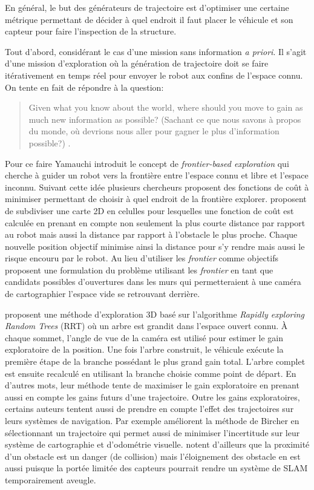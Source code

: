 En général, le but des générateurs de trajectoire est d'optimiser une certaine métrique permettant de décider à quel endroit il faut placer le véhicule et son capteur pour faire l'inspection de la structure.

Tout d'abord, considérant le cas d'une mission sans information \textit{a priori}. Il s'agit d'une mission d'exploration où la génération de trajectoire doit se faire itérativement en temps réel pour envoyer le robot aux confins de l'espace connu. On tente en fait de répondre à la question:

\begin{quote}
  Given what you know about the world, where should you move to gain as much new information as possible? (Sachant ce que nous savons à propos du monde, où devrions nous aller pour gagner le plus d'information possible?) \citep{Yamauchi1997}.
\end{quote}

Pour ce faire Yamauchi introduit le concept de \textit{frontier-based exploration} qui cherche à guider un robot vers la frontière entre l'espace connu et libre et l'espace inconnu. Suivant cette idée plusieurs chercheurs proposent des fonctions de coût à minimiser permettant de choisir à quel endroit de la frontière explorer. \citep{Wirth2007} proposent de subdiviser une carte 2D en celulles pour lesquelles une fonction de coût est calculée en prenant en compte non seulement la plus courte distance par rapport au robot mais aussi la distance par rapport à l'obstacle le plus proche. Chaque nouvelle position objectif minimise ainsi la distance pour s'y rendre mais aussi le risque encouru par le robot. Au lieu d'utiliser les \textit{frontier} comme objectifs \citep{Dornhege2011} proposent une formulation du problème utilisant les \textit{frontier} en tant que candidats possibles d'ouvertures dans les murs qui permetteraient à une caméra de cartographier l'espace vide se retrouvant derrière.

\citep{Bircher2016} proposent une méthode d'exploration 3D basé sur l'algorithme \textit{Rapidly exploring Random Trees} (RRT) où un arbre est grandit dans l'espace ouvert connu. À chaque sommet, l'angle de vue de la caméra est utilisé pour estimer le gain exploratoire de la position. Une fois l'arbre construit, le véhicule exécute la première étape de la branche possédant le plus grand gain total. L'arbre complet est ensuite recalculé en utilisant la branche choisie comme point de départ. En d'autres mots, leur méthode tente de maximiser le gain exploratoire en prenant aussi en compte les gains futurs d'une trajectoire. Outre les gains exploratoires, certains auteurs tentent aussi de prendre en compte l'effet des trajectoires sur leurs systèmes de navigation. Par exemple \citep{Papachristos2017} améliorent la méthode de Bircher en sélectionnant un trajectoire qui permet aussi de minimiser l'incertitude sur leur système de cartographie et d'odométrie visuelle. \citep{Wirth2007} notent d'ailleurs que la proximité d'un obstacle est un danger (de collision) mais l'éloignement des obstacle en est aussi puisque la portée limitée des capteurs pourrait rendre un système de SLAM temporairement aveugle.

